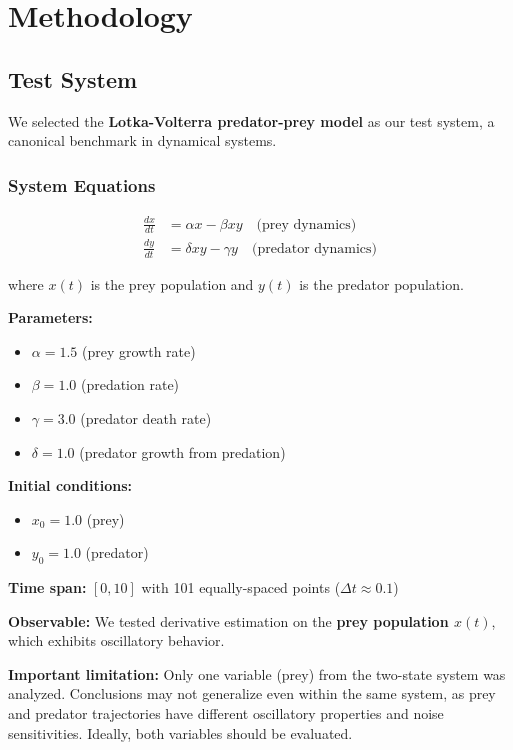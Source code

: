 \section{Methodology}
\label{sec:methodology}

\subsection{Test System}
\label{sec:test_system}

We selected the \textbf{Lotka-Volterra predator-prey model} as our test system, a canonical benchmark in dynamical systems.

\subsubsection{System Equations}

\begin{align}
\frac{dx}{dt} &= \alpha x - \beta xy \quad \text{(prey dynamics)} \\
\frac{dy}{dt} &= \delta xy - \gamma y \quad \text{(predator dynamics)}
\end{align}

where $x(t)$ is the prey population and $y(t)$ is the predator population.

\textbf{Parameters:}
\begin{itemize}
    \item $\alpha = 1.5$ (prey growth rate)
    \item $\beta = 1.0$ (predation rate)
    \item $\gamma = 3.0$ (predator death rate)
    \item $\delta = 1.0$ (predator growth from predation)
\end{itemize}

\textbf{Initial conditions:}
\begin{itemize}
    \item $x_0 = 1.0$ (prey)
    \item $y_0 = 1.0$ (predator)
\end{itemize}

\textbf{Time span:} $[0, 10]$ with 101 equally-spaced points ($\Delta t \approx 0.1$)

\textbf{Observable:} We tested derivative estimation on the \textbf{prey population $x(t)$}, which exhibits oscillatory behavior.

\textbf{Important limitation:} Only one variable (prey) from the two-state system was analyzed. Conclusions may not generalize even within the same system, as prey and predator trajectories have different oscillatory properties and noise sensitivities. Ideally, both variables should be evaluated.

